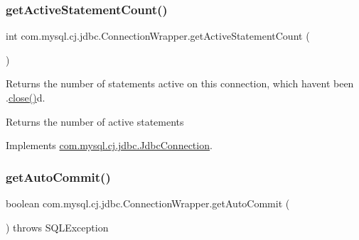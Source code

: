 \subsubsection{\texorpdfstring{get\+Active\+Statement\+Count()}{getActiveStatementCount()}}
{\footnotesize\ttfamily int com.\+mysql.\+cj.\+jdbc.\+Connection\+Wrapper.\+get\+Active\+Statement\+Count (\begin{DoxyParamCaption}{ }\end{DoxyParamCaption})}

Returns the number of statements active on this connection, which haven\textquotesingle{}t been .\mbox{\hyperlink{classcom_1_1mysql_1_1cj_1_1jdbc_1_1_connection_wrapper_a1513ad5e208ca46ac61ab5359590a0b9}{close()}}d.

\begin{DoxyReturn}{Returns}
the number of active statements 
\end{DoxyReturn}


Implements \mbox{\hyperlink{interfacecom_1_1mysql_1_1cj_1_1jdbc_1_1_jdbc_connection_aea218879f6bae7ed7717a257876582db}{com.\+mysql.\+cj.\+jdbc.\+Jdbc\+Connection}}.

\mbox{\label{classcom_1_1mysql_1_1cj_1_1jdbc_1_1_connection_wrapper_ac839f2b5d2e5f2c5a6b9e29c922578c0}} 
\subsubsection{\texorpdfstring{get\+Auto\+Commit()}{getAutoCommit()}}
{\footnotesize\ttfamily boolean com.\+mysql.\+cj.\+jdbc.\+Connection\+Wrapper.\+get\+Auto\+Commit (\begin{DoxyParamCaption}{ }\end{DoxyParamCaption}) throws S\+Q\+L\+Exception}

\mbox{\label{classcom_1_1mysql_1_1cj_1_1jdbc_1_1_connection_wrapper_a0855a0981bb14e92fee22c3591d95175}} 
